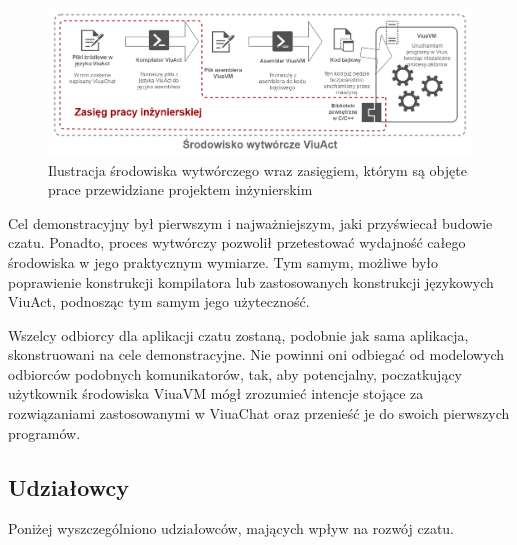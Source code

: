 \begin{figure}[h]
	\centering
	\includegraphics[width=\textwidth]{chat/fig/viuavm-env}
	\caption{Ilustracja środowiska wytwórczego wraz zasięgiem, którym są objęte prace przewidziane projektem inżynierskim}
\end{figure}

Cel demonstracyjny był pierwszym i najważniejszym, jaki przyświecał budowie
czatu. Ponadto, proces wytwórczy pozwolił przetestować wydajność całego
środowiska w jego praktycznym wymiarze. Tym samym, możliwe było poprawienie
konstrukcji kompilatora lub zastosowanych konstrukcji językowych ViuAct,
podnosząc tym samym jego użyteczność.

Wszelcy odbiorcy dla aplikacji czatu zostaną, podobnie jak sama aplikacja,
skonstruowani na cele demonstracyjne. Nie powinni oni odbiegać od modelowych
odbiorców podobnych komunikatorów, tak, aby potencjalny, poczatkujący
użytkownik środowiska ViuaVM mógł zrozumieć intencje stojące za rozwiązaniami
zastosowanymi w ViuaChat oraz przenieść je do swoich pierwszych programów.

\subsection{Udziałowcy}

Poniżej wyszczególniono udziałowców, mających wpływ na rozwój czatu.

